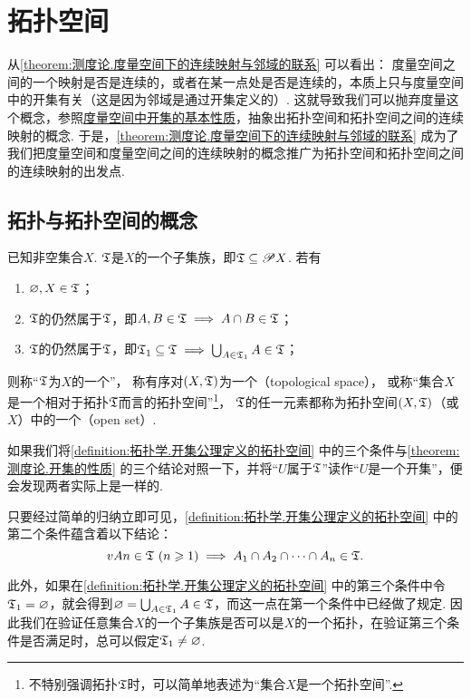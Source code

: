 \section{拓扑空间}
从\cref{theorem:测度论.度量空间下的连续映射与邻域的联系} 可以看出：
度量空间之间的一个映射是否是连续的，或者在某一点处是否是连续的，本质上只与度量空间中的开集有关（这是因为邻域是通过开集定义的）.
这就导致我们可以抛弃度量这个概念，参照\hyperref[theorem:测度论.开集的性质]{度量空间中开集的基本性质}，抽象出拓扑空间和拓扑空间之间的连续映射的概念.
于是，\cref{theorem:测度论.度量空间下的连续映射与邻域的联系} 成为了我们把度量空间和度量空间之间的连续映射的概念推广为拓扑空间和拓扑空间之间的连续映射的出发点.

\subsection{拓扑与拓扑空间的概念}
\begin{definition}\label{definition:拓扑学.开集公理定义的拓扑空间}
已知非空集合\(X\).
\(\mathfrak T\)是\(X\)的一个子集族，即\(\mathfrak T \subseteq \mathscr{P} X\).
若有
\begin{enumerate}
\item \(\varnothing,X \in \mathfrak T\)；
\item \(\mathfrak T\)的仍然属于\(\mathfrak T\)，即\(A,B \in \mathfrak T \implies A \cap B \in \mathfrak T\)；
\item \(\mathfrak T\)的仍然属于\(\mathfrak T\)，即\(\mathfrak T_1 \subseteq \mathfrak T \implies \bigcup_{A \in \mathfrak T_1} A \in \mathfrak T\)；
\end{enumerate}
则称“\(\mathfrak T\)为\(X\)的一个”，%
称有序对\((X,\mathfrak T)\)为一个（topological space），%
或称“集合\(X\)是一个相对于拓扑\(\mathfrak T\)而言的拓扑空间”\footnote{%
不特别强调拓扑\(\mathfrak T\)时，可以简单地表述为“集合\(X\)是一个拓扑空间”.%
}，%
\(\mathfrak T\)的任一元素都称为拓扑空间\((X,\mathfrak T)\)（或\(X\)）中的一个（open set）.
\end{definition}
如果我们将\cref{definition:拓扑学.开集公理定义的拓扑空间} 中的三个条件与\cref{theorem:测度论.开集的性质} 的三个结论对照一下，并将“\(U\)属于\(\mathfrak T\)”读作“\(U\)是一个开集”，便会发现两者实际上是一样的.

只要经过简单的归纳立即可见，\cref{definition:拓扑学.开集公理定义的拓扑空间} 中的第二个条件蕴含着以下结论：\[
v{A}{n}\in\mathfrak T\ (n\geqslant1)
\implies
A_1 \cap A_2 \cap \dotsb \cap A_n \in \mathfrak T.
\]

此外，如果在\cref{definition:拓扑学.开集公理定义的拓扑空间} 中的第三个条件中令\(\mathfrak T_1=\varnothing\)，就会得到\(\varnothing = \bigcup_{A\in\mathfrak T_1} A \in \mathfrak T\)，而这一点在第一个条件中已经做了规定.
因此我们在验证任意集合\(X\)的一个子集族是否可以是\(X\)的一个拓扑，在验证第三个条件是否满足时，总可以假定\(\mathfrak T_1\neq\varnothing\).

